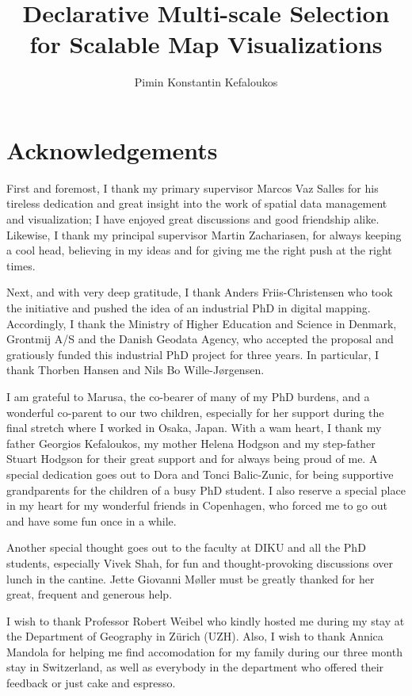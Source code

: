 \documentclass[11pt, oneside]{report}
\title{Declarative Multi-scale Selection for Scalable Map Visualizations}
\author{Pimin Konstantin Kefaloukos}
\begin{document}
\maketitle

\section*{Acknowledgements}
First and foremost, I thank my primary supervisor Marcos Vaz Salles for his tireless dedication and great insight into the work of spatial data management and visualization; I have enjoyed great discussions and good friendship alike. Likewise, I thank my principal supervisor Martin Zachariasen, for always keeping a cool head, believing in my ideas and for giving me the right push at the right times. 

Next, and with very deep gratitude, I thank Anders Friis-Christensen who took the initiative and pushed the idea of an industrial PhD in digital mapping. Accordingly, I thank the Ministry of Higher Education and Science in Denmark, Grontmij A/S and the Danish Geodata Agency, who accepted the proposal and gratiously funded this industrial PhD project for three years. In particular, I thank Thorben Hansen and Nils Bo Wille-J{\o}rgensen.

I am grateful to Marusa, the co-bearer of many of my PhD burdens, and a wonderful co-parent to our two children, especially for her support during the final stretch where I worked in Osaka, Japan. With a wam heart, I thank my father Georgios Kefaloukos, my mother Helena Hodgson and my step-father Stuart Hodgson for their great support and for always being proud of me. A special dedication goes out to Dora and Tonci Balic-Zunic, for being supportive grandparents for the children of a busy PhD student. I also reserve a special place in my heart for my wonderful friends in Copenhagen, who forced me to go out and have some fun once in a while.

Another special thought goes out to the faculty at DIKU and all the PhD students, especially Vivek Shah, for fun and thought-provoking discussions over lunch in the cantine. Jette Giovanni M{\o}ller must be greatly thanked for her great, frequent and generous help. 

I wish to thank Professor Robert Weibel who kindly hosted me during my stay at the Department of Geography in Z{\"u}rich (UZH). Also, I wish to thank Annica Mandola for helping me find accomodation for my family during our three month stay in Switzerland, as well as everybody in the department who offered their feedback or just cake and espresso. 
\end{document}
